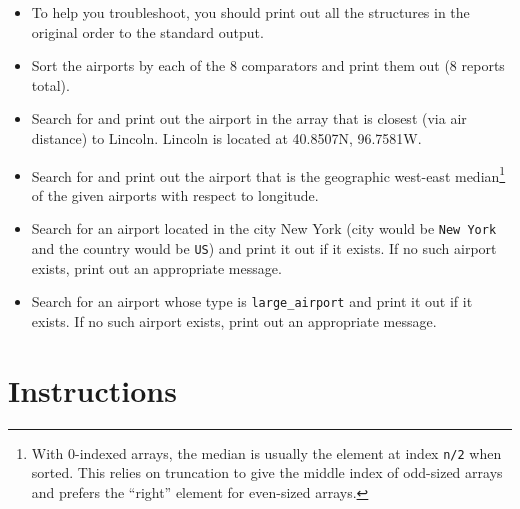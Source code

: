 \documentclass[12pt]{scrartcl}
\begin{document}
\begin{itemize}
  \item To help you troubleshoot, you should print out all the structures
  in the original order to the standard output.
  \item Sort the airports by each of the 8 comparators and print them 
  out (8 reports total).
  \item Search for and print out the airport in the array that is closest (via 
  air distance) to Lincoln.  Lincoln is located at 40.8507N, 96.7581W.
  \item Search for and print out the airport that is the geographic west-east
  median\footnote{With 0-indexed arrays, the median is usually the element at
  index \texttt{n/2} when sorted.  This relies on truncation to give 
  the middle index of odd-sized arrays and prefers the ``right'' element 
  for even-sized arrays.} 
  of the given airports with respect to longitude.  
  \item Search for an airport located in the city New York (city would 
  be \texttt{New York} and the country would be 
  \texttt{US}) and print it out
  if it exists.  If no such airport exists, print out an appropriate message.
  \item Search for an airport whose type is \texttt{large_airport} and
  print it out if it exists.  If no such airport exists, print out an appropriate message.
\end{itemize}

\section*{Instructions}
\end{document}
